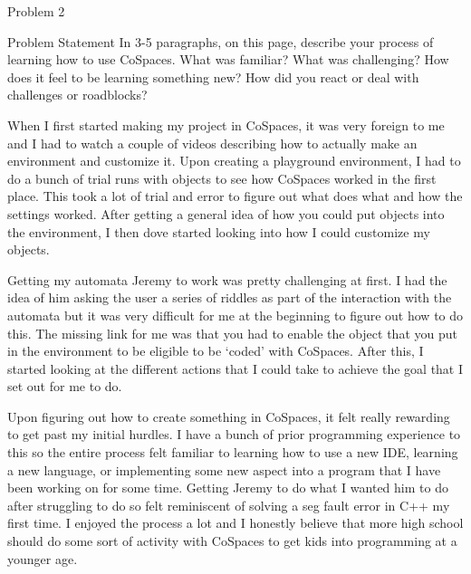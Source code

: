 \begin{problem}{Problem 2}
    \begin{statement}{Problem Statement}
        In 3-5 paragraphs, on this page, describe your process of learning how to use CoSpaces. What was familiar? What was challenging? How does it feel to be learning something new? How did you react 
        or deal with challenges or roadblocks?
    \end{statement}

    \begin{highlight}[Response]
        When I first started making my project in CoSpaces, it was very foreign to me and I had to watch a couple of videos describing how to actually make an environment and customize it. Upon creating a
        playground environment, I had to do a bunch of trial runs with objects to see how CoSpaces worked in the first place. This took a lot of trial and error to figure out what does what and how the settings
        worked. After getting a general idea of how you could put objects into the environment, I then dove started looking into how I could customize my objects.

        Getting my automata Jeremy to work was pretty challenging at first. I had the idea of him asking the user a series of riddles as part of the interaction with the automata but it was very difficult
        for me at the beginning to figure out how to do this. The missing link for me was that you had to enable the object that you put in the environment to be eligible to be `coded' with CoSpaces. After this,
        I started looking at the different actions that I could take to achieve the goal that I set out for me to do.

        Upon figuring out how to create something in CoSpaces, it felt really rewarding to get past my initial hurdles. I have a bunch of prior programming experience to this so the entire process felt familiar
        to learning how to use a new IDE, learning a new language, or implementing some new aspect into a program that I have been working on for some time. Getting Jeremy to do what I wanted him to do after
        struggling to do so felt reminiscent of solving a seg fault error in C++ my first time. I enjoyed the process a lot and I honestly believe that more high school should do some sort of activity with 
        CoSpaces to get kids into programming at a younger age.


\end{highlight}
\end{problem}
